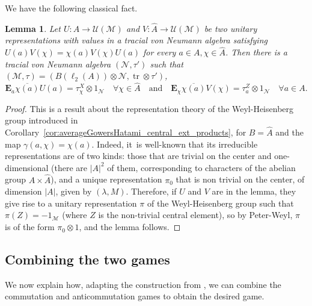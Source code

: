 \documentclass[10pt]{amsart}
\theoremstyle{plain}
\newtheorem{lemma}[theorem]{Lemma}
\theoremstyle{definition}
\newcommand{\cM}{\mathcal{M}}
\newcommand{\cN}{\mathcal{N}}
\newcommand{\E}{\mathbf{E}}
\newcommand{\cU}{\mathcal{U}}
\DeclareMathOperator{\tr}{tr}
\begin{document}
\pagebreak[2]
We have the following classical fact.
\begin{lemma}\label{lem:Pauli_matrices} Let $U:A\to \cU(\cM)$ and $V:\hat A\to\cU(\cM)$ be two unitary representations with values in a tracial von Neumann algebra satisfying $U(a) V(\chi) = \chi(a) V(\chi) U(a)$ for every $a\in A,\chi \in\hat A$. Then there is a tracial von Neumann algebra $(\cN,\tau')$ such that $(\cM ,\tau) = (B(\ell_2(A))\otimes \cN,\tr\otimes \tau')$,\vspace*{-3pt}
\[
\E_a \overline{\chi(a)}U(a) =\tau^X_\chi \otimes 1_\cN \quad\forall\chi \in\hat A\quad
\text{and}\quad
\E_\chi \overline{\chi(a)} V(\chi) = \tau^Z_a\otimes 1_\cN \quad\forall a \in A.
\]
\end{lemma}
\begin{proof} This is a result about the representation theory of the Weyl-Heisenberg group introduced in Corollary~\ref{cor:averageGowersHatami_central_ext_products}, for $B=\widehat A$ and the map $\gamma(a,\chi)=\chi(a)$. Indeed, it~is well-known that its irreducible representations are of two kinds: those that are trivial on the center and one-dimensional (there are $|A|^2$ of them, corresponding to characters of the abelian group $A\times \hat A$), and a unique representation $\pi_0$ that is non trivial on the center, of dimension $|A|$, given by $(\lambda,M)$. Therefore, if $U$ and $V$ are in the lemma, they give rise to a unitary representation $\pi$ of the Weyl-Heisenberg group such that $\pi(Z)=-1_\cM$ (where $Z$ is the non-trivial central element), so by Peter-Weyl, $\pi$ is of the form $\pi_0\otimes 1$, and the lemma follows.
\end{proof}

\subsection{Combining the two games}
We now explain how, adapting the construction from \cite{MR3678246}, we can combine the commutation and anticommutation games to obtain the desired game.
\end{document}
